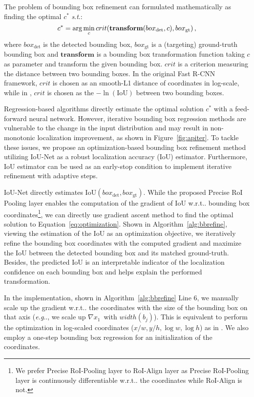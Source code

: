 \documentclass[runningheads]{llncs}
\makeatletter
\DeclareRobustCommand\onedot{\futurelet\@let@token\@onedot}
\def\@onedot{\ifx\@let@token.\else.\null\fi\xspace}
\def\eg{\emph{e.g}\onedot} \def\Eg{\emph{E.g}\onedot}
\def\wrt{w.r.t\onedot} \def\dof{d.o.f\onedot}
\makeatother
\begin{document}
The problem of bounding box refinement can formulated mathematically as finding the optimal $c^*$ \emph{s$.$t$.$}:
\begin{equation}
c^* = \arg \min_c crit {\large(} \textbf{transform}(box_{\text{det}}, c), box_{\text{gt}} \large{)}\,,
\label{eq:optimization}
\end{equation}
where $box_{\text{det}}$ is the detected bounding box, $box_{\text{gt}}$ is a (targeting) ground-truth bounding box and $\textbf{transform}$ is a bounding box transformation function taking $c$ as parameter and transform the given bounding box. $crit$ is a criterion measuring the distance between two bounding boxes. In the original Fast R-CNN \cite{dollar2014fast} framework, $crit$ is chosen as an smooth-L1 distance of coordinates in log-scale, while in \cite{yu2016unitbox}, $crit$ is chosen as the $- \ln(\text{IoU})$ between two bounding boxes.

Regression-based algorithms directly estimate the optimal solution $c^*$ with a feed-forward neural network. However, iterative bounding box regression methods are vulnerable to the change in the input distribution \cite{cai2017cascade} and may result in non-monotonic localization improvement, as shown in Figure~\ref{fig:apiter}.
To tackle these issues, we propose an optimization-based bounding box refinement method utilizing IoU-Net as a robust localization accuracy (IoU) estimator. Furthermore, IoU estimator can be used as an early-stop condition to implement iterative refinement with adaptive steps.


IoU-Net directly estimates $\mathrm{IoU}(box_{\text{det}}, box_{\text{gt}})$. While the proposed Precise RoI Pooling layer enables the computation of the gradient of IoU \wrt bounding box coordinates\footnote{We prefer Precise RoI-Pooling layer to RoI-Align layer \cite{he2017mask} as Precise RoI-Pooling layer is continuously differentiable \wrt the coordinates while RoI-Align is not.}, we can directly use gradient ascent method to find the optimal solution to Equation~\ref{eq:optimization}. Shown in Algorithm~\ref{alg:bbrefine}, viewing the estimation of the IoU as an optimization objective, we iteratively refine the bounding box coordinates with the computed gradient and maximize the IoU between the detected bounding box and its matched ground-truth. Besides, the predicted IoU is an interpretable indicator of the localization confidence on each bounding box and helps explain the performed transformation.

In the implementation, shown in Algorithm~\ref{alg:bbrefine} Line 6, we manually scale up the gradient \wrt the coordinates with the size of the bounding box on that axis (\eg, we scale up $\nabla x_1$~with $width(b_j)$). This is equivalent to perform the optimization in log-scaled coordinates ($x/w, y/h, \log w, \log h$) as in \cite{dollar2014fast}. We also employ a one-step bounding box regression for an initialization of the coordinates.
\end{document}

